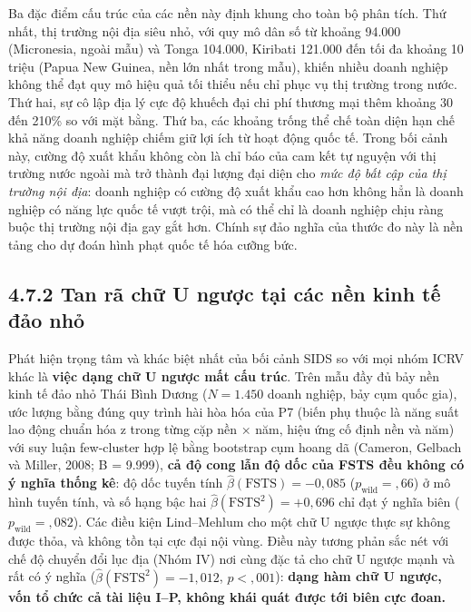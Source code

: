\documentclass[
  a4paper,
  13pt]{extreport}
\begin{document}
Ba đặc điểm cấu trúc của các nền này định khung cho toàn bộ phân tích.
Thứ nhất, thị trường nội địa siêu nhỏ, với quy mô dân số từ khoảng
94.000 (Micronesia, ngoài mẫu) và Tonga 104.000, Kiribati 121.000 đến
tối đa khoảng 10 triệu (Papua New Guinea, nền lớn nhất trong mẫu), khiến
nhiều doanh nghiệp không thể đạt quy mô hiệu quả tối thiểu nếu chỉ phục
vụ thị trường trong nước. Thứ hai, sự cô lập địa lý cực độ khuếch đại
chi phí thương mại thêm khoảng 30 đến 210\% so với mặt bằng. Thứ ba, các
khoảng trống thể chế toàn diện hạn chế khả năng doanh nghiệp chiếm giữ
lợi ích từ hoạt động quốc tế. Trong bối cảnh này, cường độ xuất khẩu
không còn là chỉ báo của cam kết tự nguyện với thị trường nước ngoài mà
trở thành đại lượng đại diện cho \emph{mức độ bất cập của thị trường nội
địa}: doanh nghiệp có cường độ xuất khẩu cao hơn không hẳn là doanh
nghiệp có năng lực quốc tế vượt trội, mà có thể chỉ là doanh nghiệp chịu
ràng buộc thị trường nội địa gay gắt hơn. Chính sự đảo nghĩa của thước
đo này là nền tảng cho dự đoán hình phạt quốc tế hóa cưỡng bức.

\hypertarget{tan-ruxe3-chux1eef-u-ngux1b0ux1ee3c-tux1ea1i-cuxe1c-nux1ec1n-kinh-tux1ebf-ux111ux1ea3o-nhux1ecf}{%
\subsection{4.7.2 Tan rã chữ U ngược tại các nền kinh tế đảo
nhỏ}\label{tan-ruxe3-chux1eef-u-ngux1b0ux1ee3c-tux1ea1i-cuxe1c-nux1ec1n-kinh-tux1ebf-ux111ux1ea3o-nhux1ecf}}

Phát hiện trọng tâm và khác biệt nhất của bối cảnh SIDS so với mọi nhóm
ICRV khác là \textbf{việc dạng chữ U ngược mất cấu trúc}. Trên mẫu đầy
đủ bảy nền kinh tế đảo nhỏ Thái Bình Dương (\(N = 1.450\) doanh nghiệp,
bảy cụm quốc gia), ước lượng bằng đúng quy trình hài hòa hóa của P7
(biến phụ thuộc là năng suất lao động chuẩn hóa z trong từng cặp nền ×
năm, hiệu ứng cố định nền và năm) với suy luận few-cluster hợp lệ bằng
bootstrap cụm hoang dã (Cameron, Gelbach và Miller, 2008; B = 9.999),
\textbf{cả độ cong lẫn độ dốc của FSTS đều không có ý nghĩa thống kê}:
độ dốc tuyến tính \(\hat{\beta}(\text{FSTS}) = -0{,}085\)
(\(p_{\text{wild}} = {,}66\)) ở mô hình tuyến tính, và số hạng bậc hai
\(\hat{\beta}(\text{FSTS}^2) = +0{,}696\) chỉ đạt ý nghĩa biên
(\(p_{\text{wild}} = {,}082\)). Các điều kiện Lind--Mehlum cho một chữ U
ngược thực sự không được thỏa, và không tồn tại cực đại nội vùng. Điều
này tương phản sắc nét với chế độ chuyển đổi lục địa (Nhóm IV) nơi cùng
đặc tả cho chữ U ngược mạnh và rất có ý nghĩa
(\(\hat{\beta}(\text{FSTS}^2) = -1{,}012\), \(p < {,}001\)):
\textbf{dạng hàm chữ U ngược, vốn tổ chức cả tài liệu I--P, không khái
quát được tới biên cực đoan.}
\end{document}
